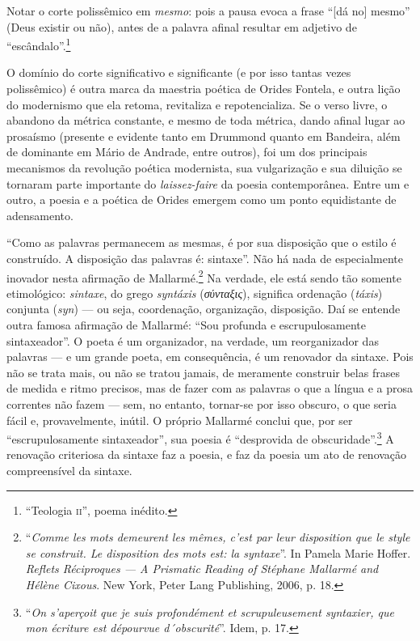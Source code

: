 Notar o corte polissêmico em \emph{mesmo}: pois a pausa evoca a frase
``{[}dá no{]} mesmo'' (Deus existir ou não), antes de a palavra aﬁnal
resultar em adjetivo de ``escândalo''.\footnote{``Teologia \textsc{ii}'', poema inédito.}

O domínio do corte signiﬁcativo e signiﬁcante (e por isso tantas vezes
polissêmico) é outra marca da maestria poética de Orides Fontela, e
outra lição do modernismo que ela retoma, revitaliza e repotencializa.
Se o verso livre, o abandono da métrica constante, e mesmo de toda
métrica, dando aﬁnal lugar ao prosaísmo (presente e evidente tanto em
Drummond
quanto em Bandeira, além de dominante em Mário de Andrade, entre outros), foi um dos principais mecanismos da revolução poética modernista,
sua vulgarização e sua diluição se tornaram parte importante do
\emph{laissez-faire} da poesia contemporânea. Entre um e outro, a poesia e a
poética de Orides emergem como um ponto equidistante de adensamento.

``Como as palavras permanecem as mesmas, é por sua disposição que o
estilo é construído. A disposição das palavras é: sintaxe''. Não há nada
de especialmente inovador nesta aﬁrmação de Mallarmé.\footnote{``\emph{Comme les mots demeurent les mêmes, c'est par leur
disposition que le style se construit. Le disposition des mots est: la
syntaxe}''. In Pamela Marie Hoffer. \emph{Reﬂets Réciproques --- A Prismatic Reading of Stéphane Mallarmé and Hélène Cixous}.
New York, Peter Lang Publishing, 2006, p. 18.} Na verdade, ele
está sendo tão somente etimológico: \emph{sintaxe}, do grego
\emph{syntáxis} (\emph{σύνταξις}), signiﬁca ordenação (\emph{táxis})
conjunta (\emph{syn}) --- ou seja, coordenação, organização,
disposição. Daí se entende outra famosa aﬁrmação de Mallarmé: ``Sou
profunda e escrupulosamente sintaxeador''. O poeta é um organizador,
na verdade, um reorganizador das palavras --- e um grande poeta, em
consequência, é um renovador da sintaxe. Pois não se trata mais, ou não
se tratou jamais, de meramente construir belas frases de medida e ritmo
precisos, mas de fazer com as palavras o que a língua e a prosa
correntes não fazem --- sem, no entanto, tornar-se por isso obscuro, o
que seria fácil e, provavelmente, inútil. O próprio Mallarmé conclui
que, por ser ``escrupulosamente sintaxeador'', sua poesia é
``desprovida de obscuridade''.\footnote{``\emph{On s'aperçoit que je suis profondément et scrupuleusement syntaxier, que mon écriture est dépourvue d´obscurité}''. Idem, p. 17.} A renovação criteriosa da sintaxe faz a
poesia, e faz da poesia um ato de renovação compreensível da sintaxe.

